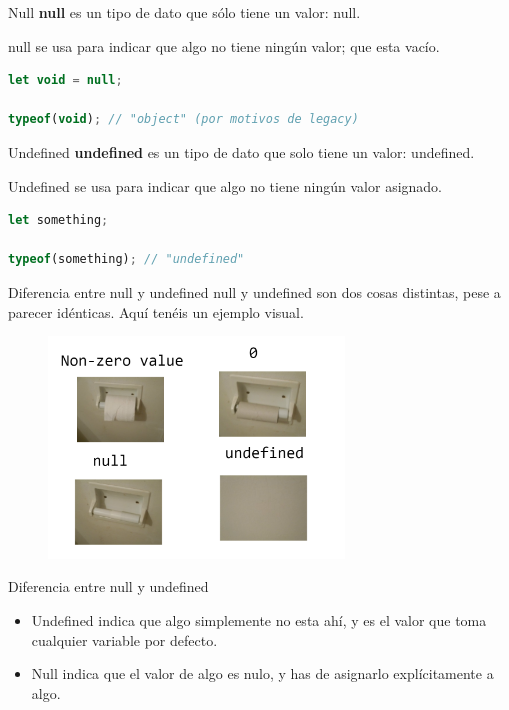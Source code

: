 \documentclass{beamer}
\begin{document}
\begin{frame}[fragile]{Null}
\textbf{null} es un tipo de dato que sólo tiene un valor: null.

null se usa para indicar que algo no tiene ningún valor; que esta vacío.

\begin{lstlisting}[language=JavaScript]
let void = null;

typeof(void); // "object" (por motivos de legacy)

\end{lstlisting}
\end{frame}

\begin{frame}[fragile]{Undefined}
\textbf{undefined} es un tipo de dato que solo tiene un valor: undefined.

Undefined se usa para indicar que algo no tiene ningún valor asignado.

\begin{lstlisting}[language=JavaScript]
let something;

typeof(something); // "undefined"
\end{lstlisting}
\end{frame}

\begin{frame}{Diferencia entre null y undefined}
null y undefined son dos cosas distintas, pese a parecer idénticas. Aquí tenéis un ejemplo visual.

    \begin{figure}
        \centering
        \includegraphics[width=0.7\textwidth]{images/undefinednull.png}
    \end{figure}
\end{frame}

\begin{frame}{Diferencia entre null y undefined}
\begin{itemize}
    \item Undefined indica que algo simplemente no esta ahí, y es el valor que toma cualquier variable por defecto.
    \item Null indica que el valor de algo es nulo, y has de asignarlo explícitamente a algo.
\end{itemize}
\end{frame}
\end{document}
